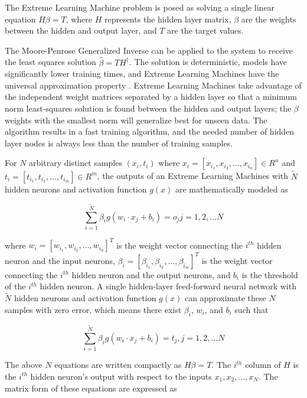 The Extreme Learning Machine problem is posed as solving a single linear equation $H \beta = T$, where $H$ represents the hidden layer matrix, $\beta$ are the weights between the hidden and output layer, and $T$ are the target values.

The Moore-Penrose Generalized Inverse can be applied to the system to receive the least squares solution $\hat{\beta} = T {H}^\dagger$.
The solution is deterministic, models have significantly lower training times, and Extreme Learning Machines have the universal approximation property \citet{Huang2:2006}.
Extreme Learning Machines take advantage of the independent weight matrices separated by a hidden layer so that a minimum norm least-squares solution is found between the hidden and output layers; the $\beta $ weights with the smallest norm will generalize best for unseen data.
The algorithm results in a fast training algorithm, and the needed number of hidden layer nodes is always less than the number of training samples.

For $N$ arbitrary distinct samples $(x_i, t_i) $ where $x_i = \left[ x_{i_{1}}, x_{i_{2}}, \dots, x_{i_{n}} \right] \in R^n$ and $t_i = \left[ t_{i_{1}}, t_{i_{2}}, \dots, t_{i_{m}} \right] \in R^m$, the outputs of an Extreme Learning Machines with $\tilde{N}$ hidden neurons and activation function $g(x)$ are mathematically modeled as

\begin{equation}
	\sum_{i=1}^{\tilde{N}} \beta_i g (w_i \cdot x_j + b_i)=o_j         j=1,2, \dots N\label{eq:equation3}
\end{equation}

where $w_i = \left[ w_{i_{1}}, w_{i_{2}}, \dots, w_{i_{n}} \right]^T$ is the weight vector connecting the $i^{th}$ hidden neuron and the input neurons, $\beta_i=\left[ \beta_{i_{1}}, \beta_{i_{2}}, \dots, \beta_{i_{m}}\right]^T$ is the weight vector connecting the $i^{th}$ hidden neuron and the output neurons, and $b_i$ is the threshold of the $i^{th}$ hidden neuron.
A single hidden-layer feed-forward neural network with $\tilde{N}$ hidden neurons and activation function $g(x)$ can approximate these $N$ samples with zero error, which means there exist $\beta_i$, $w_i$, and $b_i$ such that

\begin{equation}
	\sum_{ i = 1}^{\tilde{N}} \beta_i g (w_i \cdot x_j + b_i) = t_j, 	j=1,2, \dots N\label{eq:equation4}
\end{equation}

The above $N$ equations are written compactly as $H \beta = T$.
The $i^{th}$ column of $H$ is the $i^{th}$ hidden neuron’s output with respect to the inputs $x_1, x_2, \dots, x_N$.
The matrix form of these equations are expressed as

